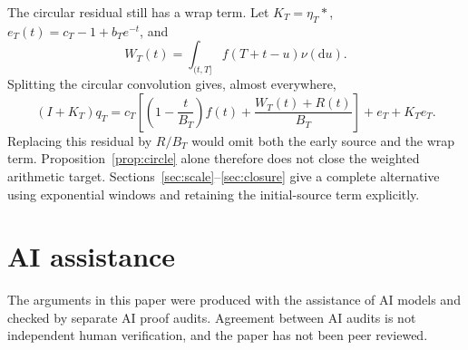 \documentclass[11pt,letterpaper]{article}
\numberwithin{equation}{section}
\theoremstyle{definition}
\theoremstyle{remark}
\begin{document}
The circular residual still has a wrap term. Let $K_T=\eta_T*$,
$e_T(t)=c_T-1+b_Te^{-t}$, and
\[
 W_T(t)=\int_{(t,T]}f(T+t-u)\nu(\mathrm du).
\]
Splitting the circular convolution gives, almost everywhere,
\begin{equation}\label{eq:wrap}
 (I+K_T)q_T
 =c_T\left[\left(1-\frac t{B_T}\right)f(t)
                  +\frac{W_T(t)+R(t)}{B_T}\right]+e_T+K_Te_T.
\end{equation}
Replacing this residual by $R/B_T$ would omit both the early source and
the wrap term. Proposition~\ref{prop:circle} alone therefore does not close
the weighted arithmetic target. Sections~\ref{sec:scale}--\ref{sec:closure}
give a complete alternative using exponential windows and retaining
the initial-source term explicitly.

\section*{AI assistance}

The arguments in this paper were produced with the assistance of AI models
and checked by separate AI proof audits. Agreement between AI audits is not
independent human verification, and the paper has not been peer reviewed.
\end{document}

